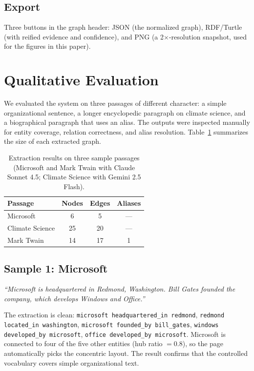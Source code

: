 \documentclass[11pt,a4paper]{article}
\begin{document}
\subsection{Export}

Three buttons in the graph header: JSON (the normalized graph), RDF/Turtle (with reified evidence and confidence), and PNG (a 2$\times$-resolution snapshot, used for the figures in this paper).

\section{Qualitative Evaluation}\label{sec:evaluation}

We evaluated the system on three passages of different character: a simple organizational sentence, a longer encyclopedic paragraph on climate science, and a biographical paragraph that uses an alias. The outputs were inspected manually for entity coverage, relation correctness, and alias resolution. Table~\ref{tab:results} summarizes the size of each extracted graph.

\begin{table}[ht]
\centering\small
\caption{Extraction results on three sample passages (Microsoft and Mark Twain with Claude Sonnet 4.5; Climate Science with Gemini 2.5 Flash).}
\label{tab:results}
\begin{tabular}{lccc}
\toprule
\textbf{Passage} & \textbf{Nodes} & \textbf{Edges} & \textbf{Aliases} \\
\midrule
Microsoft       & 6   & 5   & --- \\
Climate Science & 25  & 20  & --- \\
Mark Twain      & 14  & 17  & 1 \\
\bottomrule
\end{tabular}
\end{table}

\subsection{Sample 1: Microsoft}

\emph{``Microsoft is headquartered in Redmond, Washington. Bill Gates founded the company, which develops Windows and Office.''}

The extraction is clean: \texttt{microsoft headquartered\_in redmond}, \texttt{redmond located\_in washington}, \texttt{microsoft founded\_by bill\_gates}, \texttt{windows developed\_by microsoft}, \texttt{office developed\_by microsoft}. Microsoft is connected to four of the five other entities (hub ratio $= 0.8$), so the page automatically picks the concentric layout. The result confirms that the controlled vocabulary covers simple organizational text.
\end{document}
